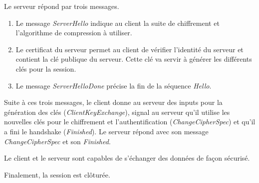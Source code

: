 Le serveur répond par trois messages.
\begin{enumerate}
	\item Le message \textit{ServerHello} indique au client la suite de chiffrement et l'algorithme de compression à utiliser.
	\item Le certificat du serveur permet au client de vérifier l'identité du serveur et contient la clé publique du serveur. Cette clé va servir à générer les différents clés pour la session.
	\item Le message \textit{ServerHelloDone} précise la fin de la séquence \textit{Hello}.
\end{enumerate}
Suite à ces trois messages, le client donne au serveur des inputs pour la génération des clés (\textit{ClientKeyExchange}), signal au serveur qu'il utilise les nouvelles clés pour le chiffrement et l'authentification (\textit{ChangeCipherSpec}) et qu'il a fini le handshake (\textit{Finished}). Le serveur répond avec son message \textit{ChangeCipherSpec} et son \textit{Finished}.
 
Le client et le serveur sont capables de s'échanger des données de façon sécurisé. 

Finalement, la session est clôturée.